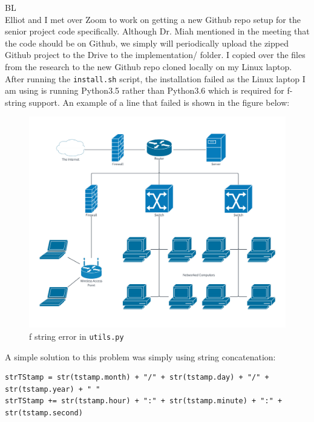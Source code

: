 \documentclass[fontsize=11pt, %
                             paper=letter, %
                             openany, %
                             captions=tableheading,
                             index=totoc,
                             hyperref]{labbook}
\begin{document}
\begin{addmargin}[0cm]{0cm}


BL\\
Elliot and I met over Zoom to work on getting a new Github repo setup for the senior project code specifically. Although Dr. Miah mentioned in the meeting that the code should be on Github, we simply will periodically upload the zipped Github project to the Drive to the implementation/ folder. I copied over the files from the research to the new Github repo cloned locally on my Linux laptop. After running the \texttt{install.sh} script, the installation failed as the Linux laptop I am using is running Python3.5 rather than Python3.6 which is required for f-string support. An example of a line that failed is shown in the figure below:
\begin{figure}[H]
\centering
\includegraphics[scale=0.6]{figs/img/installSyntaxError.png}
\caption{f string error in \texttt{utils.py}}
\end{figure}
A simple solution to this problem was simply using string concatenation:
\begin{Verbatim}
strTStamp = str(tstamp.month) + "/" + str(tstamp.day) + "/" + str(tstamp.year) + " "
strTStamp += str(tstamp.hour) + ":" + str(tstamp.minute) + ":" + str(tstamp.second)
\end{Verbatim}

\end{addmargin}
\end{document}
